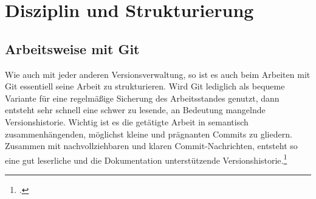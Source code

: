 \section{Disziplin und Strukturierung}
\subsection{Arbeitsweise mit Git}

Wie auch mit jeder anderen Versionsverwaltung, so ist es auch beim Arbeiten mit Git essentiell seine Arbeit zu strukturieren. Wird Git lediglich als bequeme Variante für eine regelmäßige Sicherung des Arbeitsstandes genutzt, dann entsteht sehr schnell eine schwer zu lesende, an Bedeutung mangelnde Versionshistorie. Wichtig ist es die getätigte Arbeit in semantisch zusammenhängenden, möglichst kleine und prägnanten Commits zu gliedern.
Zusammen mit nachvollziehbaren und klaren Commit-Nachrichten, entsteht so eine gut leserliche und die Dokumentation unterstützende Versionshistorie.\footcite[Making only one change per commit][]{git-essentials-2017}
